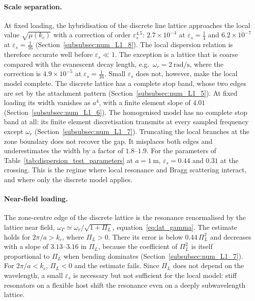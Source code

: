 {\paragraph{Scale separation.} At fixed loading, the hybridisation of the discrete line lattice approaches the local value $\sqrt{\mu(k_c)}$ with a correction of order $\varepsilon_s^{4.5}$: $2.7\times10^{-4}$ at $\varepsilon_s=\tfrac14$ and $6.2\times10^{-7}$ at $\varepsilon_s=\tfrac1{16}$ (Section~\ref{subsubsec:num_L1_8}). The local dispersion relation is therefore accurate well before $\varepsilon_s\ll1$. The exception is a lattice that is coarse compared with the evanescent decay length, e.g.\ $\omega_r=2~\si{\radian\per\second}$, where the correction is $4.9\times10^{-5}$ at $\varepsilon_s=\tfrac1{16}$. Small $\varepsilon_s$ does not, however, make the local model complete. The discrete lattice has a complete stop band, whose two edges are set by the attachment pattern (Section~\ref{subsubsec:num_L1_5}). At fixed loading its width vanishes as $a^4$, with a finite element slope of $4.01$ (Section~\ref{subsubsec:num_L1_6}). The homogenised model has no complete stop band at all: its finite element discretisation transmits at every sampled frequency except $\omega_r$ (Section~\ref{subsubsec:num_L1_7}). Truncating the local branches at the zone boundary does not recover the gap. It misplaces both edges and underestimates the width by a factor of $1.8$--$1.9$. For the parameters of Table~\ref{tab:dispersion_test_parameters} at $a=1~\si{\meter}$, $\varepsilon_s=0.44$ and $0.31$ at the crossing. This is the regime where local resonance and Bragg scattering interact, and where only the discrete model applies.

\paragraph{Near-field loading.} The zone-centre edge of the discrete lattice is the resonance renormalised by the lattice near field, $\omega_\Gamma\simeq\omega_r/\sqrt{1+\Pi_L}$, equation~\eqref{eq:lat_gamma}. The estimate holds for $2\pi/a>k_c$, where $\Pi_L>0$. There its error is below $0.44\,\Pi_L^2$ and decreases with a slope of $3.13$--$3.16$ in $\Pi_L$, because the coefficient of $\Pi_L^2$ is itself proportional to $\Pi_L$ when bending dominates (Section~\ref{subsubsec:num_L1_7}). For $2\pi/a<k_c$, $\Pi_L<0$ and the estimate fails. Since $\Pi_L$ does not depend on the wavelength, a small $\varepsilon_s$ is necessary but not sufficient for the local model: stiff resonators on a flexible host shift the resonance even on a deeply subwavelength lattice.

}
